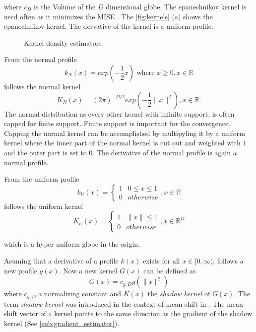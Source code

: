 where $c_D$ is the Volume of the $D$ dimensional globe. The epanechnikov kernel
is used often as it minimizes the \gls{MISE} \citep{citeulike:5813637}. The
\autoref{fig:kernels} (a) shows the epanechnikov kernel. The dervative of the 
kernel is a uniform profile.



\begin{figure}[ht]
\centering
\caption{Kernel density estimators}
\label{fig:kernels}
\end{figure}

From the normal profile
\begin{equation}\label{eq:nml}
	k_N(x) = exp \left( - \frac{1}{2} x \right) \textrm{ where } x \geq 0, x \in \mathbb{R}
\end{equation}
follows the normal kernel
\begin{equation}\label{eq:nmlk}
	K_N(x) = (2\pi)^{-D/2}exp\left( -\frac{1}{2} \lVert x \rVert^2 \right), x \in \mathbb{R}.
\end{equation}
The normal distribution as every other kernel with infinite support, is often
capped for finite support. Finite support is important for the convergence. Capping
the normal kernel can be accomplished by multipyling it by a uniform kernel where
the inner part of the normal kernel is cut out and weighted with $1$ and the 
outer part is set to $0$. The derivative of the normal profile is again a 
normal profile.

From the uniform profile 
\begin{equation}\label{eq:unf}
	k_U(x) = \begin{cases}
				1 &  0 \leq x \leq 1\\
				0 & \mathit{otherwise}
		\end{cases}, x \in \mathbb{R}
\end{equation}
follows the uniform kernel
\begin{equation}\label{eq:unfk}
	K_U(x) = \begin{cases}
				1 &  \lVert x \rVert  \leq 1\\
				0 & \mathit{otherwise}
		\end{cases}, x \in \mathbb{R}^D
\end{equation}

which is a {\color{iRed}hyper uniform globe} in the origin. 

Asuming that a derivative of a profile $k(x)$ exists for all $x \in [0, \infty)$, 
follows a new profile $g(x)$. Now a new kernel $G(x)$ can be defined as 
\begin{equation}\label{eq:shadowk}
	G(x) = c_{g,D}g(\lVert x \rVert^2)
\end{equation}
where $c_{g,D}$ a normalizing constant and $K(x)$ the \emph{shadow kernel} of 
$G(x)$. The term \emph{shadow kernel} was introduced in the context of mean 
shift in \citep{citeulike:2522867}. The mean shift vector of a kernel points to 
the same direction as the gradient of the shadow kernel (See \autoref{sub:gradient_estimator}). 


